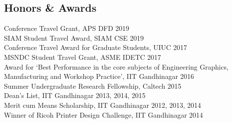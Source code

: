 \documentclass[margin]{res}
\begin{document}
\begin{resume}
%
%
		 
\section{\large Honors \& Awards}
Conference Travel Grant, APS DFD \hfill 2019\vspace{0.1cm}\\
SIAM Student Travel Award, SIAM CSE \hfill 2019\vspace{0.1cm}\\
Conference Travel Award for Graduate Students, UIUC \hfill 2017\vspace{0.1cm}\\
MSNDC Student Travel Grant, ASME IDETC \hfill 2017\vspace{0.1cm}\\
Award for `Best Performance in the core subjects of Engineering Graphics, Manufacturing and Workshop Practice', IIT Gandhinagar \hfill 2016\vspace{0.1cm}\\
Summer Undergraduate Research Fellowship, Caltech \hfill 2015\vspace{0.1cm}\\
Dean's List, IIT Gandhinagar \hfill 2013, 2014, 2015\vspace{0.1cm}\\
Merit cum Means Scholarship, IIT Gandhinagar \hfill 2012, 2013, 2014\vspace{0.1cm}\\
Winner of Ricoh Printer Design Challenge, IIT Gandhinagar \hfill 2014


\end{resume}
\end{document}
